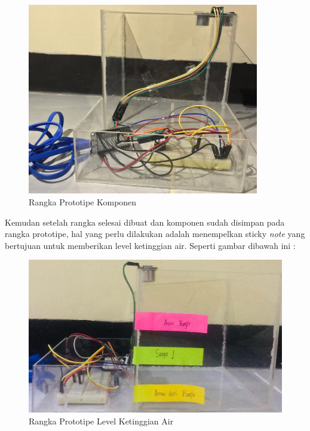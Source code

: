 \begin{figure}[H]
\centering
\includegraphics[width=0.9\textwidth]{figures/alat3.jpeg}
\caption{Rangka Prototipe Komponen }
\label{print}
\end{figure}

\par Kemudan setelah rangka selesai dibuat dan komponen sudah disimpan pada rangka prototipe, hal yang perlu dilakukan adalah menempelkan sticky \textit{note} yang bertujuan untuk memberikan level ketinggian air. Seperti gambar dibawah ini :
\begin{figure}[H]
\centering
\includegraphics[width=1\textwidth]{figures/alat4.jpeg}
\caption{Rangka Prototipe Level Ketinggian Air }
\label{print}
\end{figure}